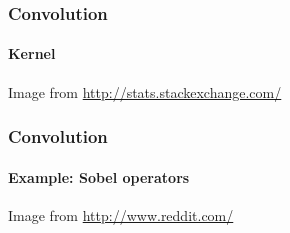 \documentclass[9pt]{beamer}
\begin{document}
\begin{frame}

  \frametitle{Convolution}

  \framesubtitle{Kernel}

  \begin{center}
  \end{center}

  {\small Image from \url{http://stats.stackexchange.com/}}

\end{frame}

\begin{frame}

  \frametitle{Convolution}

  \framesubtitle{Example: Sobel operators}

  \begin{center}
    \scalebox{0.9}{
      
    }
  \end{center}
  
  {\small Image from \url{http://www.reddit.com/}}
\end{frame}
\end{document}
